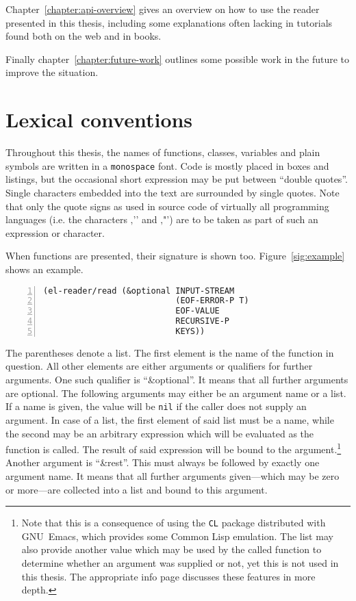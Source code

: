 \documentclass[a4paper,10pt,twoside]{report}
\newcommand{\cl}{Common Lisp}
\newcommand{\sym}[1]{\texttt{#1}}
\newcommand{\emacs}{GNU~Emacs}
\newcommand{\nil}{\sym{nil}}
\begin{document}
Chapter~\ref{chapter:api-overview} gives an overview on how to use the
reader presented in this thesis, including some explanations often lacking in
tutorials found both on the web and in books.

Finally chapter~\ref{chapter:future-work} outlines some possible work in the
future to improve the situation.

\section{Lexical conventions}
\label{sec:lexical-conv}

Throughout this thesis, the names of functions, classes, variables and plain
symbols are written in a \texttt{monospace} font.  Code is mostly placed in
boxes and listings, but the occasional short expression may be put between
``double quotes''.  Single characters embedded into the text are surrounded by
single quotes.  Note that only the quote signs as used in source code of
virtually all programming languages (i.e. the characters ‚'’ and ‚"’) are to be
taken as part of such an expression or character.

When functions are presented, their signature is shown too.
Figure~\ref{sig:example} shows an example.

\begin{lstlisting}[style=lispcode,label={sig:example},caption={Example function
signature},numbers=left]
(el-reader/read (&optional INPUT-STREAM
                           (EOF-ERROR-P T)
                           EOF-VALUE
                           RECURSIVE-P
                           KEYS))
\end{lstlisting}

The parentheses denote a list.  The first element is the name of the function in
question.  All other elements are either arguments or qualifiers for further
arguments.  One such qualifier is ``\&optional''.  It means that all further
arguments are optional.  The following arguments may either be an argument name
or a list.  If a name is given, the value will be \nil{} if the caller does not
supply an argument.  In case of a list, the first element of said list must be a
name, while the second may be an arbitrary expression which will be evaluated as
the function is called.  The result of said expression will be bound to the
argument.\footnote{Note that this is a consequence of using the \texttt{CL}
  package distributed with \emacs{}, which provides some \cl{} emulation.  The
  list may also provide another value which may be used by the called function
  to determine whether an argument was supplied or not, yet this is not used in
  this thesis.  The appropriate info page discusses these features in more
  depth.}  Another argument is ``\&rest''.  This must always be followed by
exactly one argument name.  It means that all further arguments given---which
may be zero or more---are collected into a list and bound to this argument.
\end{document}
